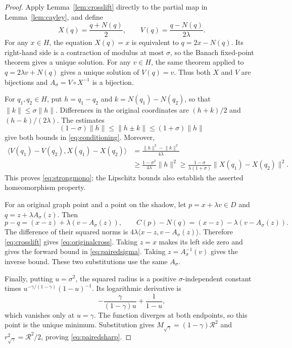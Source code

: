 \documentclass[11pt]{article}
\numberwithin{equation}{section}
\theoremstyle{definition}
\theoremstyle{remark}
\newcommand{\rad}{\mathcal R}
\newcommand{\ip}[2]{\langle #1,#2\rangle}
\newcommand{\norm}[1]{\lVert #1\rVert}
\begin{document}
\begin{proof}
Apply Lemma~\ref{lem:crosslift} directly to the partial map in
Lemma~\ref{lem:cayley}, and define
\begin{equation}\label{eq:shadowparam}
 X(q)=\frac{q+N(q)}2,\qquad
 V(q)=\frac{q-N(q)}{2\lambda}.
\end{equation}
For any $x\in H$, the equation $X(q)=x$ is equivalent to
$q=2x-N(q)$. Its right-hand side is a contraction of modulus at most
$\sigma$, so the Banach fixed-point theorem gives a unique solution.
For any $v\in H$, the same theorem applied to $q=2\lambda v+N(q)$ gives
a unique solution of $V(q)=v$. Thus both $X$ and $V$ are bijections and
$A_\sigma=V\circ X^{-1}$ is a bijection.

For $q_1,q_2\in H$, put $h=q_1-q_2$ and $k=N(q_1)-N(q_2)$, so that
$\norm{k}\le\sigma\norm{h}$. Differences in the original coordinates
are $(h+k)/2$ and $(h-k)/(2\lambda)$. The estimates
\[
 (1-\sigma)\norm{h}\le\norm{h\pm k}
 \le(1+\sigma)\norm{h}
\]
give both bounds in \eqref{eq:conditioning}. Moreover,
\begin{align*}
 \ip{V(q_1)-V(q_2)}{X(q_1)-X(q_2)}
 &=\frac{\norm{h}^2-\norm{k}^2}{4\lambda}\\
 &\ge\frac{1-\sigma^2}{4\lambda}\norm{h}^2
 \ge\frac{1-\sigma}{\lambda(1+\sigma)}
       \norm{X(q_1)-X(q_2)}^2.
\end{align*}
This proves \eqref{eq:strongmono}; the Lipschitz bounds also establish
the asserted homeomorphism property.

For an original graph point and a point on the shadow, let
$p=x+\lambda v\in D$ and $q=z+\lambda A_\sigma(z)$. Then
\[
 p-q=(x-z)+\lambda(v-A_\sigma(z)),\qquad
 C(p)-N(q)=(x-z)-\lambda(v-A_\sigma(z)).
\]
The difference of their squared norms is
$4\lambda\ip{x-z}{v-A_\sigma(z)}$. Therefore
\eqref{eq:crosslift} gives \eqref{eq:originalcross}.
Taking $z=x$ makes its left side zero and gives the forward bound in
\eqref{eq:pairedsigma}. Taking $z=A_\sigma^{-1}(v)$ gives the inverse
bound. These two substitutions use the same $A_\sigma$.

Finally, putting $u=\sigma^2$, the squared radius is a positive
$\sigma$-independent constant times
$u^{-\gamma/(1-\gamma)}(1-u)^{-1}$. Its logarithmic derivative is
\[
 -\frac{\gamma}{(1-\gamma)u}+\frac1{1-u},
\]
which vanishes only at $u=\gamma$. The function diverges at both
endpoints, so this point is the unique minimum. Substitution gives
$M_{\sqrt\gamma}=(1-\gamma)\rad^2$ and $r_{\sqrt\gamma}^2=\rad^2/2$,
proving \eqref{eq:pairedsharp}.
\end{proof}
\end{document}
